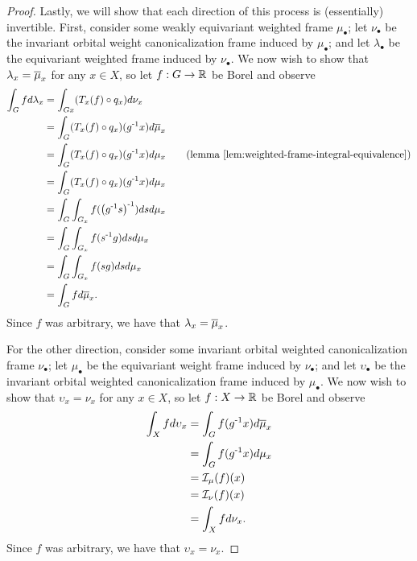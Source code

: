 \begin{theorem}
\begin{proof}
        Lastly, we will show that each direction of this process is (essentially) invertible.
        First, consider some weakly equivariant weighted frame $\mu_\bullet$; let $\nu_\bullet$ be the invariant orbital weight canonicalization frame induced by $\mu_\bullet$; and let $\lambda_\bullet$ be the equivariant weighted frame induced by $\nu_\bullet$.
        We now wish to show that $\lambda_x = \Bar{\mu}_x$ for any $x \in X$, so let $f : G \to \R$ be Borel and observe
        \begin{align*}
            \int_G f d \lambda_x
            &= \int_{Gx} (T_x (f) \circ q_x) d \nu_x \\
            &= \int_G (T_x (f) \circ q_x) (\inv{g} x) d \Bar{\mu}_x \\
            &= \int_G (T_x (f) \circ q_x) (\inv{g} x) d \mu_x \tag{lemma \ref{lem:weighted-frame-integral-equivalence}} \\
            &= \int_G (T_x (f) \circ q_x) (\inv{g} x) d \mu_x \\
            &= \int_G \int_{G_x} f (\pinv{\inv{g} s}) ds d \mu_x \\
            &= \int_G \int_{G_x} f (\inv{s} g) ds d \mu_x \\
            &= \int_G \int_{G_x} f (s g) ds d \mu_x \\
            &= \int_G f d \Bar{\mu}_x.
        \end{align*}
        Since $f$ was arbitrary, we have that $\lambda_x = \Bar{\mu}_x$.
        
        For the other direction, consider some invariant orbital weighted canonicalization frame $\nu_\bullet$; let $\mu_\bullet$ be the equivariant weight frame induced by $\nu_\bullet$; and let $\upsilon_\bullet$ be the invariant orbital weighted canonicalization frame induced by $\mu_\bullet$.
        We now wish to show that $\upsilon_x = \nu_x$ for any $x \in X$, so let $f : X \to \R$ be Borel and observe
        \begin{align*}
            \int_X f d \upsilon_x
            &= \int_G f (\inv{g} x) d \Bar{\mu}_x \\
            &= \int_G f (\inv{g} x) d \mu_x \\
            &= \II_{\mu} (f) (x) \\
            &= \II_{\nu} (f) (x) \\
            &= \int_X f d \nu_x.
        \end{align*}
        Since $f$ was arbitrary, we have that $\upsilon_x = \nu_x$.
    \end{proof}
\end{theorem}


